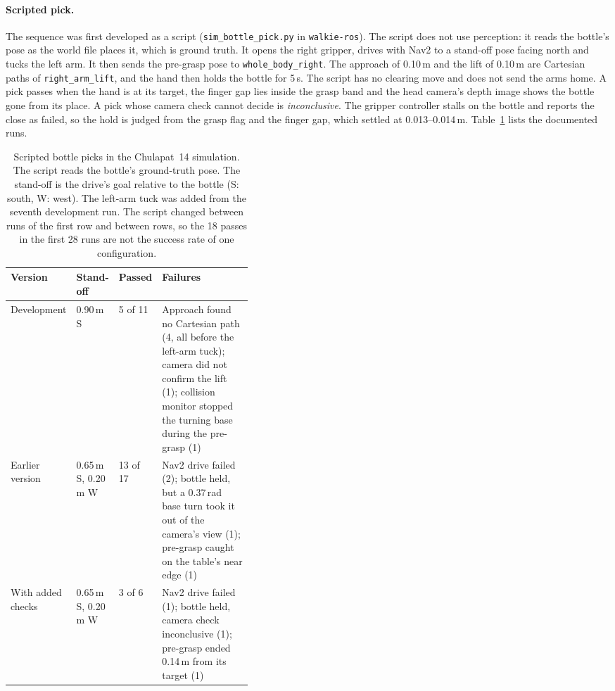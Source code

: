 \documentclass[12pt,a4paper]{article}
\begin{document}
\paragraph{Scripted pick.}
The sequence was first developed as a script (\texttt{sim\_bottle\_pick.py} in \texttt{walkie-ros}).
The script does not use perception: it reads the bottle's pose as the world file places it, which is
ground truth. It opens the right gripper, drives with Nav2 to a stand-off pose facing north and tucks
the left arm. It then sends the pre-grasp pose to \texttt{whole\_body\_right}. The approach of 0.10\,m
and the lift of 0.10\,m are Cartesian paths of \texttt{right\_arm\_lift}, and the hand then holds the
bottle for 5\,s. The script has no clearing move and does not send the arms home. A pick passes when the hand is at its target, the finger gap lies
inside the grasp band and the head camera's depth image shows the bottle gone from its place. A pick
whose camera check cannot decide is \emph{inconclusive}. The gripper controller stalls on the bottle
and reports the close as failed, so the hold is judged from the grasp flag and the finger gap, which
settled at 0.013--0.014\,m. Table~\ref{tab:pick_scripted} lists the documented runs.

\begin{table}[H]
    \centering
    \small
    \renewcommand{\arraystretch}{1.15}
    \begin{tabular}{lllp{0.40\linewidth}}
        \toprule
        Version & Stand-off & Passed & Failures \\
        \midrule
        Development       & 0.90\,m S          & 5 of 11  & Approach found no Cartesian path (4, all before
        the left-arm tuck); camera did not confirm the lift (1); collision monitor stopped the turning base
        during the pre-grasp (1) \\
        Earlier version   & 0.65\,m S, 0.20\,m W & 13 of 17 & Nav2 drive failed (2); bottle held, but a
        0.37\,rad base turn took it out of the camera's view (1); pre-grasp caught on the table's near
        edge (1) \\
        With added checks & 0.65\,m S, 0.20\,m W & 3 of 6   & Nav2 drive failed (1); bottle held, camera
        check inconclusive (1); pre-grasp ended 0.14\,m from its target (1) \\
        \bottomrule
    \end{tabular}
    \caption{\small{Scripted bottle picks in the Chulapat~14 simulation. The script reads the bottle's
    ground-truth pose. The stand-off is the drive's goal relative to the bottle (S: south, W: west). The
    left-arm tuck was added from the seventh development run. The script changed between runs of the
    first row and between rows, so the 18 passes in the first 28 runs are not the success rate of one
    configuration.}}
    \label{tab:pick_scripted}
\end{table}
\end{document}

